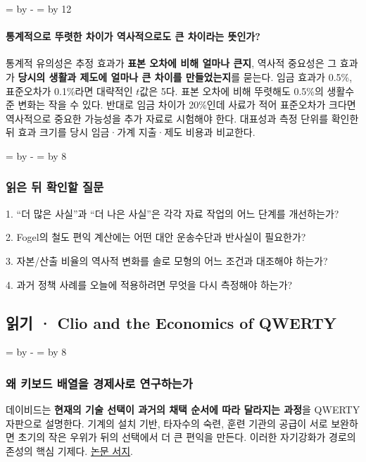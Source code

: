 \documentclass[10pt,a4paper]{article}
\newcommand{\ReserveQuestionSpace}{%
  \par\begingroup
  \dimen0=\pagegoal \advance\dimen0 by -\pagetotal
  \dimen2=\baselineskip \multiply\dimen2 by 12
  \ifdim\dimen0<\dimen2 \newpage\fi
  \endgroup}
\newcommand{\ReserveReadingSectionSpace}{%
  \par\begingroup
  \dimen0=\pagegoal \advance\dimen0 by -\pagetotal
  \dimen2=\baselineskip \multiply\dimen2 by 8
  \ifdim\dimen0<\dimen2 \newpage\fi
  \endgroup}
\begin{document}
\ReserveQuestionSpace
\paragraph{통계적으로 뚜렷한 차이가 역사적으로도 큰 차이라는 뜻인가?}
통계적 유의성은 추정 효과가 \textbf{표본 오차에 비해 얼마나 큰지}, 역사적 중요성은 그 효과가 \textbf{당시의 생활과 제도에 얼마나 큰 차이를 만들었는지}를 묻는다. 임금 효과가 0.5\%, 표준오차가 0.1\%라면 대략적인 $t$값은 5다. 표본 오차에 비해 뚜렷해도 0.5\%의 생활수준 변화는 작을 수 있다. 반대로 임금 차이가 20\%인데 사료가 적어 표준오차가 크다면 역사적으로 중요한 가능성을 추가 자료로 시험해야 한다. 대표성과 측정 단위를 확인한 뒤 효과 크기를 당시 임금·가계 지출·제도 비용과 비교한다.\par

\ReserveReadingSectionSpace
\subsubsection*{읽은 뒤 확인할 질문}

1. “더 많은 사실”과 “더 나은 사실”은 각각 자료 작업의 어느 단계를 개선하는가?\par
2. Fogel의 철도 편익 계산에는 어떤 대안 운송수단과 반사실이 필요한가?\par
3. 자본/산출 비율의 역사적 변화를 솔로 모형의 어느 조건과 대조해야 하는가?\par
4. 과거 정책 사례를 오늘에 적용하려면 무엇을 다시 측정해야 하는가?\par


\clearpage{}
{}
\subsection*{읽기 · Clio and the Economics of QWERTY}
\ReserveReadingSectionSpace
\subsubsection*{왜 키보드 배열을 경제사로 연구하는가}

데이비드는 \textbf{현재의 기술 선택이 과거의 채택 순서에 따라 달라지는 과정}을 QWERTY 자판으로 설명한다. 기계의 설치 기반, 타자수의 숙련, 훈련 기관의 공급이 서로 보완하면 초기의 작은 우위가 뒤의 선택에서 더 큰 편익을 만든다. 이러한 자기강화가 경로의존성의 핵심 기제다. \href{https://www.jstor.org/stable/1805621}{논문 서지}.\par
\end{document}
